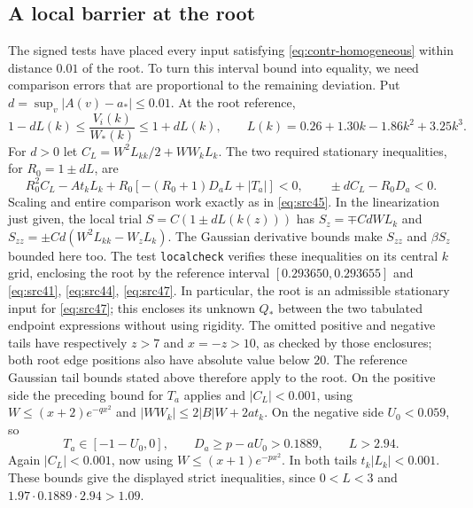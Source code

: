 \documentclass[11pt,a4paper]{article}
\numberwithin{equation}{section}
\theoremstyle{definition}
\theoremstyle{remark}
\begin{document}
\subsection{A local barrier at the root}

The signed tests have placed every input satisfying
\eqref{eq:contr-homogeneous} within distance $0.01$ of the root.  To
turn this interval bound into equality, we need comparison errors that
are proportional to the remaining deviation.  Put
$d=\sup_v|A(v)-a_*|\le0.01$.  At the root reference,
\begin{equation}
 1-dL(k)\le \frac{V_i(k)}{W_*(k)}\le1+dL(k),\qquad
 L(k)=0.26+1.30k-1.86k^2+3.25k^3.
 \label{eq:src48}
\end{equation}
For $d>0$ let $C_L=W^2L_{kk}/2+WW_kL_k$.  The two required
stationary inequalities, for $R_0=1\pm dL$, are
\[
 R_0^2C_L-At_kL_k+R_0[-(R_0+1)D_aL+|T_a|]<0,
 \qquad \pm dC_L-R_0D_a<0.
\]
Scaling and entire comparison work exactly as in
\eqref{eq:src45}.  In the linearization just given, the local trial
$S=C(1\pm dL(k(z)))$ has
$S_z=\mp CdWL_k$ and
$S_{zz}=\pm Cd(W^2L_{kk}-W_zL_k)$.
The Gaussian derivative bounds make $S_{zz}$ and $\beta S_z$
bounded here too.  The test \texttt{localcheck} verifies these
inequalities on its central $k$ grid, enclosing the root by the
reference interval $[0.293650,0.293655]$ and
\eqref{eq:src41}, \eqref{eq:src44}, \eqref{eq:src47}.
In particular, the root is an admissible stationary input for
\eqref{eq:src47}; this encloses its unknown $Q_*$ between the
two tabulated endpoint expressions without using rigidity.
The omitted positive and negative tails have respectively $z>7$ and
$x=-z>10$, as checked by those enclosures; both root edge positions
also have absolute value below $20$.  The reference Gaussian tail
bounds stated above therefore apply to the root.  On the positive side the
preceding bound for $T_a$ applies and $|C_L|<0.001$, using
$W\le(x+2)e^{-qx^2}$ and
$|WW_k|\le2|B|W+2at_k$.
On the negative side $U_0<0.059$, so
\[
 T_a\in[-1-U_0,0],\qquad D_a\ge p-aU_0>0.1889,\qquad L>2.94.
\]
Again $|C_L|<0.001$, now using $W\le(x+1)e^{-px^2}$.
In both tails $t_k|L_k|<0.001$.  These bounds give the displayed
strict inequalities, since $0<L<3$ and
$1.97\cdot0.1889\cdot2.94>1.09$.
\end{document}
